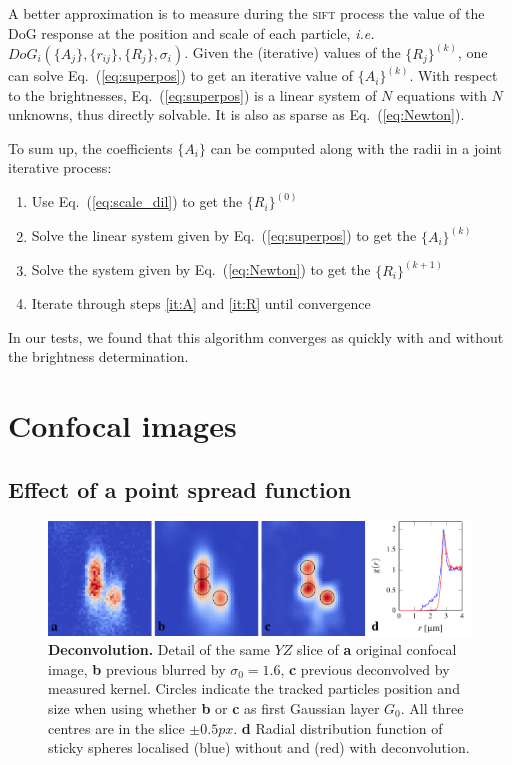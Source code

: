 \documentclass[8.5pt,twoside,twocolumn]{article}
\begin{document}
A better approximation is to measure during the \textsc{sift} process the value of the DoG response at the position and scale of each particle, \emph{i.e.} $DoG_i(\lbrace A_j\rbrace, \lbrace r_{ij}\rbrace, \lbrace R_j\rbrace, \sigma_i)$. Given the (iterative) values of the $\lbrace R_j\rbrace^{(k)}$, one can solve Eq.~(\ref{eq:superpos}) to get an iterative value of $\lbrace A_i\rbrace^{(k)}$. With respect to the brightnesses, Eq.~(\ref{eq:superpos}) is a linear system of $N$ equations with $N$ unknowns, thus directly solvable. It is also as sparse as Eq.~(\ref{eq:Newton}).

To sum up, the coefficients $\lbrace A_i\rbrace$ can be computed along with the radii in a joint iterative process:
\begin{enumerate}
\item Use Eq.~(\ref{eq:scale_dil}) to get the $\lbrace R_i\rbrace^{(0)}$
\item Solve the linear system given by Eq.~(\ref{eq:superpos}) to get the $\lbrace A_i\rbrace^{(k)}$ \label{it:A}
\item Solve the system given by Eq.~(\ref{eq:Newton}) to get the $\lbrace R_i\rbrace^{(k+1)}$ \label{it:R}
\item Iterate through steps \ref{it:A} and \ref{it:R} until convergence
\end{enumerate}


In our tests, we found that this algorithm converges as quickly with and without the brightness determination.

\section{Confocal images}
\label{sec:confocal}

\subsection{Effect of a point spread function}
\begin{figure}
\centering
\includegraphics{fig_deconv.pdf}
	\caption{\textbf{Deconvolution.} Detail of the same $YZ$ slice of \textbf{a} original confocal image, \textbf{b} previous blurred by $\sigma_0=1.6$, \textbf{c} previous deconvolved by measured kernel. Circles indicate the tracked particles position and size when using whether \textbf{b} or \textbf{c} as first Gaussian layer $G_0$. All three centres are in the slice $\pm \unit{0.5}{px}$. \textbf{d} Radial distribution function of sticky spheres localised (blue) without and (red) with deconvolution.}
	\label{fig:deconv}
\end{figure}
\end{document}
